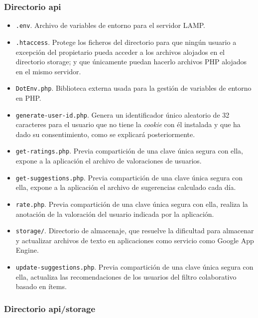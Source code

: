 \subsubsection{Directorio \guillemotleft api\guillemotright\space}

\begin{itemize}
	\item \texttt{.env}. Archivo de variables de entorno para el servidor LAMP.
	\item \texttt{.htaccess}. Protege los ficheros del directorio para que ningún usuario a excepción del propietario pueda acceder a los archivos alojados en el directorio \guillemotleft storage\guillemotright\space; y que únicamente puedan hacerlo archivos PHP alojados en el mismo servidor.
	\item \texttt{DotEnv.php}. Biblioteca externa usada para la gestión de variables de entorno en PHP.
	\item \texttt{generate-user-id.php}. Genera un identificador único aleatorio de 32 caracteres para el usuario que no tiene la \textit{cookie} con él instalada y que ha dado su consentimiento, como se explicará posteriormente. 
	\item \texttt{get-ratings.php}. Previa compartición de una clave única segura con ella, expone a la aplicación el archivo de valoraciones de usuarios.
	\item \texttt{get-suggestions.php}. Previa compartición de una clave única segura con ella, expone a la aplicación el archivo de sugerencias calculado cada día.
	\item \texttt{rate.php}. Previa compartición de una clave única segura con ella, realiza la anotación de la valoración del usuario indicada por la aplicación.
	\item \texttt{storage/}. Directorio de almacenaje, que resuelve la dificultad para almacenar y actualizar archivos de texto en aplicaciones como servicio como Google App Engine.
	\item \texttt{update-suggestions.php}. Previa compartición de una clave única segura con ella, actualiza las recomendaciones de los usuarios del filtro colaborativo basado en ítems. 

\end{itemize}

\subsubsection{Directorio \guillemotleft api/storage\guillemotright\space}


